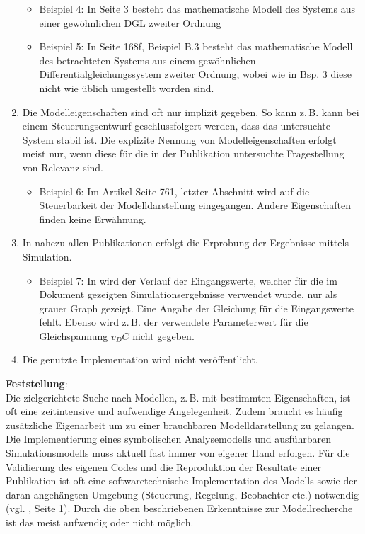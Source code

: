\begin{enumerate}
\begin{itemize}[label=$\bullet$]
		\item Beispiel 4: In \cite{BUT21} Seite 3 besteht das mathematische Modell des Systems aus einer gewöhnlichen DGL zweiter Ordnung
		\item Beispiel 5: In \cite{KNO16} Seite 168f, Beispiel B.3 besteht das mathematische Modell des betrachteten Systems aus einem gewöhnlichen Differentialgleichungssystem zweiter Ordnung, wobei wie in Bsp. 3 diese nicht wie üblich umgestellt worden sind.
	\end{itemize}
	\item  Die Modelleigenschaften sind oft nur implizit gegeben. So kann z.\,B. kann bei einem Steuerungsentwurf geschlussfolgert werden, dass das untersuchte System stabil ist. Die explizite Nennung von Modelleigenschaften erfolgt meist nur, wenn diese für die in der Publikation untersuchte Fragestellung von Relevanz sind. 
	\begin{itemize}[label=$\bullet$]
		\item Beispiel 6: Im Artikel \cite{PEGUEA16} Seite 761, letzter Abschnitt wird auf die Steuerbarkeit der Modelldarstellung eingegangen. Andere Eigenschaften finden keine Erwähnung.
	\end{itemize}
	\item In nahezu allen Publikationen erfolgt die Erprobung der Ergebnisse mittels Simulation. 
	\begin{itemize}[label=$\bullet$]
		\item Beispiel 7: In \cite{BUT21} wird der Verlauf der Eingangswerte, welcher für die im Dokument gezeigten Simulationsergebnisse verwendet wurde, nur als grauer Graph gezeigt. Eine Angabe der Gleichung für die Eingangswerte fehlt. Ebenso wird z.\,B. der verwendete Parameterwert für die Gleichspannung $v_DC$ nicht gegeben.
	\end{itemize}
	\item Die genutzte Implementation wird nicht veröffentlicht.
\end{enumerate}

\textbf{Feststellung}:\\
Die zielgerichtete Suche nach Modellen, z.\,B. mit bestimmten Eigenschaften, ist oft eine zeitintensive und aufwendige Angelegenheit. Zudem braucht es häufig zusätzliche Eigenarbeit um zu einer brauchbaren Modelldarstellung zu gelangen. Die Implementierung eines symbolischen Analysemodells und ausführbaren Simulationsmodells muss aktuell fast immer von eigener Hand erfolgen. Für die Validierung des eigenen Codes und die Reproduktion der Resultate einer Publikation ist oft eine softwaretechnische Implementation des Modells sowie der daran angehängten Umgebung (Steuerung, Regelung, Beobachter etc.) notwendig (vgl. \cite{KNHE20b}, Seite 1). Durch die oben beschriebenen Erkenntnisse zur Modellrecherche ist das meist aufwendig oder nicht möglich.

